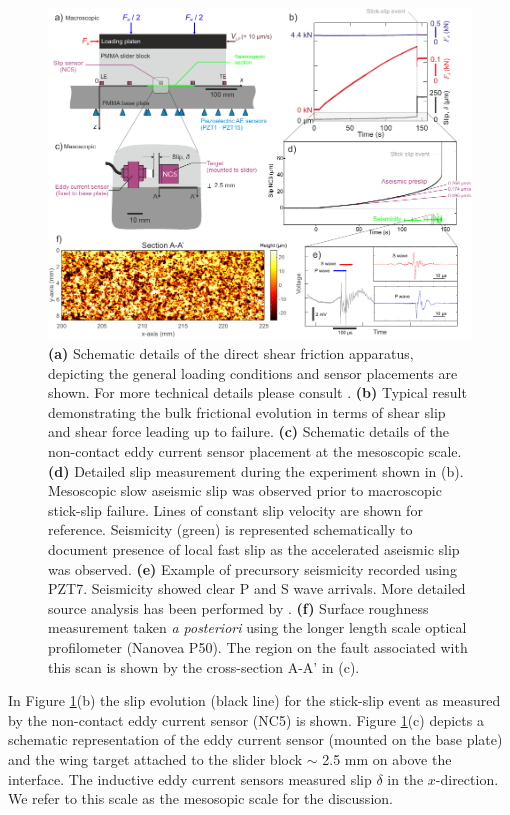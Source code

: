 \documentclass[preprint,1p, 10pt,authoryear]{elsarticle}
\begin{document}
\begin{figure}
 	\centering
 	\includegraphics{FIG1_revised.pdf} 
 	\caption{ \textbf{(a)} Schematic details of the direct shear friction apparatus, depicting the general loading conditions and sensor placements are shown. For more technical details please consult \citet{Selvadurai2015, Selvadurai2015a}. \textbf{(b)} Typical result demonstrating the bulk frictional evolution in terms of shear slip and shear force leading up to failure. \textbf{(c)} Schematic details of the non-contact eddy current sensor placement at the mesoscopic scale. \textbf{(d)} Detailed slip measurement during the experiment shown in (b).  Mesoscopic slow aseismic slip was observed prior to macroscopic stick-slip failure.  Lines of constant slip velocity are shown for reference.  Seismicity (green) is represented schematically to document presence of local fast slip as the accelerated aseismic slip was observed. \textbf{(e)}  Example of precursory seismicity recorded using PZT7.  Seismicity showed clear P and S wave arrivals. More detailed source analysis has been performed by \citet{Selvadurai2019}. \textbf{(f)} Surface roughness measurement taken \textit{a posteriori} using the longer length scale optical profilometer (Nanovea P50).  The region on the fault associated with this scan is shown by the cross-section A-A’ in (c).}
 	\label{fig1}
 \end{figure}
In Figure \ref{fig1}(b) the slip evolution (black line) for the stick-slip event as measured by the non-contact eddy current sensor (NC5) is shown.  Figure \ref{fig1}(c) depicts a schematic representation of the eddy current sensor (mounted on the base plate) and the wing target attached to the slider block $\sim$ 2.5 mm on above the interface.  The inductive eddy current sensors measured slip $\delta$ in the $x$-direction. We refer to this scale as the mesosopic scale for the discussion.
 
\end{document}
